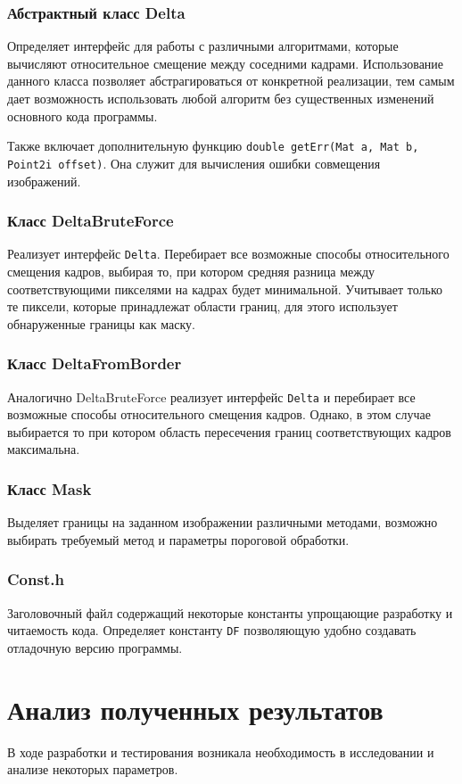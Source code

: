 \subsubsection{Абстрактный класс Delta~}
Определяет интерфейс для работы с различными алгоритмами, которые вычисляют относительное смещение между соседними кадрами. Использование данного класса позволяет абстрагироваться от конкретной реализации, тем самым дает возможность использовать любой алгоритм без существенных изменений основного кода программы. 

Также включает дополнительную функцию \texttt{double getErr(Mat a, Mat b, Point2i offset)}. Она служит для вычисления ошибки совмещения изображений.
\subsubsection{Класс DeltaBruteForce~}
Реализует интерфейс \texttt{Delta}. Перебирает все возможные способы относительного смещения кадров, выбирая то, при котором средняя разница между соответствующими пикселями на кадрах будет минимальной. Учитывает только те пиксели, которые принадлежат области границ, для этого использует обнаруженные границы как маску.
\subsubsection{Класс DeltaFromBorder~}
Аналогично DeltaBruteForce реализует интерфейс \texttt{Delta} и перебирает все возможные способы относительного смещения кадров. Однако,  в этом случае выбирается то при котором область пересечения границ соответствующих кадров максимальна.
\subsubsection{Класс Mask~}
Выделяет границы на заданном изображении различными методами, возможно выбирать требуемый метод и параметры пороговой обработки.
\subsubsection{Const.h~}
Заголовочный файл содержащий некоторые константы упрощающие разработку и читаемость кода. Определяет константу \texttt{DF} позволяющую удобно создавать отладочную версию программы.
\section{Анализ полученных результатов}
В ходе разработки и тестирования возникала необходимость в исследовании и анализе некоторых параметров. 
